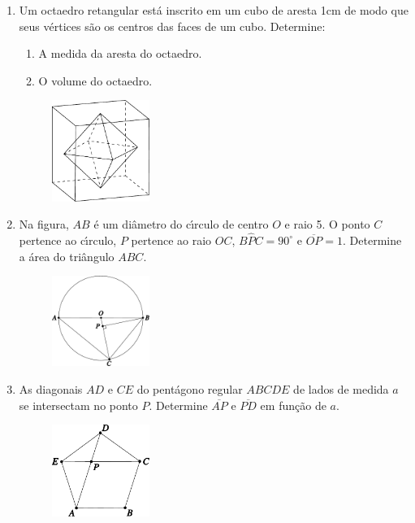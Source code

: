 \documentclass[a4paper,5pt]{amsbook}
\begin{document}
\begin{enumerate}
    \item Um octaedro retangular est\'a inscrito em um cubo de aresta 1cm de modo
        que seus v\'ertices s\~ao os centros das faces de um cubo. Determine:
        \begin{enumerate}
            \vspace{0.3cm}
            \item A medida da aresta do octaedro.
            \vspace{0.3cm}
            \item O volume do octaedro.
        \end{enumerate}
        \begin{figure}[!h]
            \centering
            \includegraphics[width=0.3\textwidth]{fig03-3.pdf}
        \end{figure}

    \item Na figura, $AB$ \'e um di\^ametro do c\'{\i}rculo de centro $O$ e raio 5. O
        ponto $C$ pertence ao c\'{\i}rculo, $P$ pertence ao raio $OC$,
        $B\hat{P}C=90^\circ$ e $\overline{OP}=1$. Determine a \'area do tri\^angulo
        $ABC$.
        \begin{figure}[!h]
            \centering
            \includegraphics[width=0.3\textwidth]{fig03-4.pdf}
        \end{figure}

    \item As diagonais $AD$ e $CE$ do pent\'agono regular $ABCDE$ de lados de
        medida $a$ se intersectam no ponto $P$. Determine $\overline{AP}$ e
        $\overline{PD}$ em fun\c{c}\~ao de $a$.
        \begin{figure}[!h]
            \centering
            \includegraphics[width=0.3\textwidth]{fig03-5.pdf}
        \end{figure}
\end{enumerate}
\end{document}
